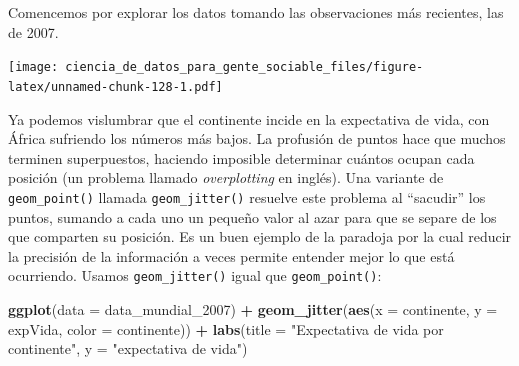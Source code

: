 \documentclass[spanish,]{book}
\newenvironment{Shaded}{\begin{snugshade}}{\end{snugshade}}
\newcommand{\DataTypeTok}[1]{\textcolor[rgb]{0.13,0.29,0.53}{#1}}
\newcommand{\DecValTok}[1]{\textcolor[rgb]{0.00,0.00,0.81}{#1}}
\newcommand{\KeywordTok}[1]{\textcolor[rgb]{0.13,0.29,0.53}{\textbf{#1}}}
\newcommand{\NormalTok}[1]{#1}
\newcommand{\OperatorTok}[1]{\textcolor[rgb]{0.81,0.36,0.00}{\textbf{#1}}}
\newcommand{\StringTok}[1]{\textcolor[rgb]{0.31,0.60,0.02}{#1}}
\begin{document}
Comencemos por explorar los datos tomando las observaciones más recientes, las de 2007.

\begin{Shaded}
\end{Shaded}

\texttt{[image: ciencia\_de\_datos\_para\_gente\_sociable\_files/figure-latex/unnamed-chunk-128-1.pdf]}

Ya podemos vislumbrar que el continente incide en la expectativa de vida, con África sufriendo los números más bajos. La profusión de puntos hace que muchos terminen superpuestos, haciendo imposible determinar cuántos ocupan cada posición (un problema llamado \emph{overplotting} en inglés). Una variante de \texttt{geom\_point()} llamada \texttt{geom\_jitter()} resuelve este problema al ``sacudir'' los puntos, sumando a cada uno un pequeño valor al azar para que se separe de los que comparten su posición. Es un buen ejemplo de la paradoja por la cual reducir la precisión de la información a veces permite entender mejor lo que está ocurriendo. Usamos \texttt{geom\_jitter()} igual que \texttt{geom\_point()}:

\begin{Shaded}
\begin{Highlighting}[]
\KeywordTok{ggplot}\NormalTok{(}\DataTypeTok{data =}\NormalTok{ data_mundial_}\DecValTok{2007}\NormalTok{) }\OperatorTok{+}
\StringTok{    }\KeywordTok{geom_jitter}\NormalTok{(}\KeywordTok{aes}\NormalTok{(}\DataTypeTok{x =}\NormalTok{ continente, }\DataTypeTok{y =}\NormalTok{ expVida, }\DataTypeTok{color =}\NormalTok{ continente)) }\OperatorTok{+}
\StringTok{    }\KeywordTok{labs}\NormalTok{(}\DataTypeTok{title =} \StringTok{"Expectativa de vida por continente"}\NormalTok{,}
         \DataTypeTok{y =} \StringTok{"expectativa de vida"}\NormalTok{)}
\end{Highlighting}
\end{Shaded}
\end{document}
